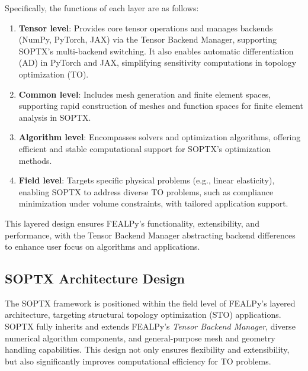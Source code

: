 \documentclass[mathpazo]{cicp}
\begin{document}
Specifically, the functions of each layer are as follows:
\begin{enumerate} 
	\item \textbf{Tensor level}: Provides core tensor operations and manages backends (NumPy, PyTorch, JAX) via the Tensor Backend Manager, supporting SOPTX’s multi-backend switching. It also enables automatic differentiation (AD) in PyTorch and JAX, simplifying sensitivity computations in topology optimization (TO).
	\item \textbf{Common level}: Includes mesh generation and finite element spaces, supporting rapid construction of meshes and function spaces for finite element analysis in SOPTX.
	\item \textbf{Algorithm level}: Encompasses solvers and optimization algorithms, offering efficient and stable computational support for SOPTX’s optimization methods.
	\item \textbf{Field level}: Targets specific physical problems (e.g., linear elasticity), enabling SOPTX to address diverse TO problems, such as compliance minimization under volume constraints, with tailored application support.
\end{enumerate}
This layered design ensures FEALPy’s functionality, extensibility, and performance, with the Tensor Backend Manager abstracting backend differences to enhance user focus on algorithms and applications.

\subsection{SOPTX Architecture Design}
The SOPTX framework is positioned within the field level of FEALPy’s layered architecture, targeting structural topology optimization (STO) applications. SOPTX fully inherits and extends FEALPy’s \textit{Tensor Backend Manager}, diverse numerical algorithm components, and general-purpose mesh and geometry handling capabilities. This design not only ensures flexibility and extensibility, but also significantly improves computational efficiency for TO problems.
\end{document}

